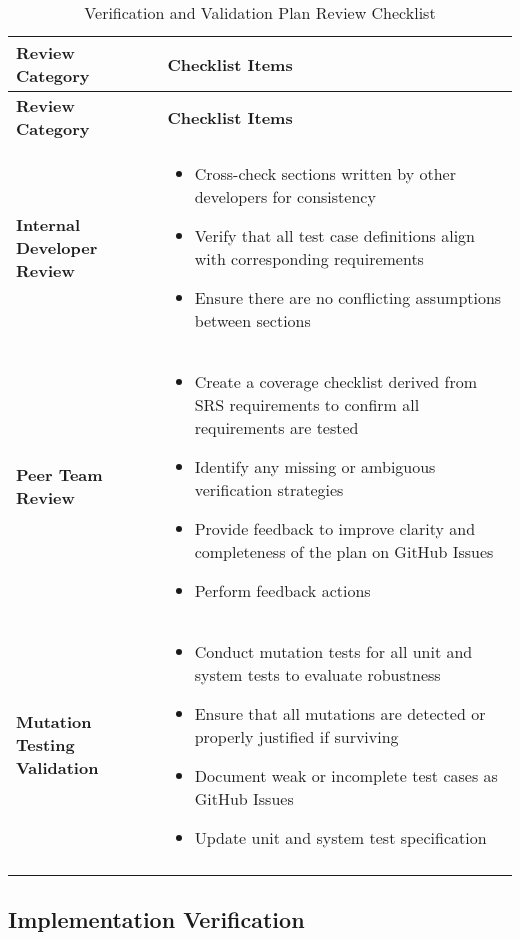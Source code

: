 \documentclass[12pt, titlepage]{article}
\begin{document}
\begin{longtable}{|p{4cm}|p{11cm}|}
\hline
\textbf{Review Category} & \textbf{Checklist Items} \\
\hline
\endfirsthead

\hline
\textbf{Review Category} & \textbf{Checklist Items} \\
\hline
\endhead

\textbf{Internal Developer Review} &
\begin{itemize}
  \item Cross-check sections written by other developers for consistency
  \item Verify that all test case definitions align with corresponding requirements
  \item Ensure there are no conflicting assumptions between sections
\end{itemize}
\\
\hline

\textbf{Peer Team Review} &
\begin{itemize}
  \item Create a coverage checklist derived from SRS requirements to confirm all requirements are tested
  \item Identify any missing or ambiguous verification strategies
  \item Provide feedback to improve clarity and completeness of the plan on GitHub Issues
  \item Perform feedback actions
\end{itemize}
\\
\hline

\textbf{Mutation Testing Validation} &
\begin{itemize}
  \item Conduct mutation tests for all unit and system tests to evaluate robustness
  \item Ensure that all mutations are detected or properly justified if surviving
  \item Document weak or incomplete test cases as GitHub Issues
  \item Update unit and system test specification
\end{itemize}
\\
\hline

\caption{Verification and Validation Plan Review Checklist}
\label{tab:vnv_plan_checklist}
\end{longtable}


\subsection{Implementation Verification}
\end{document}
